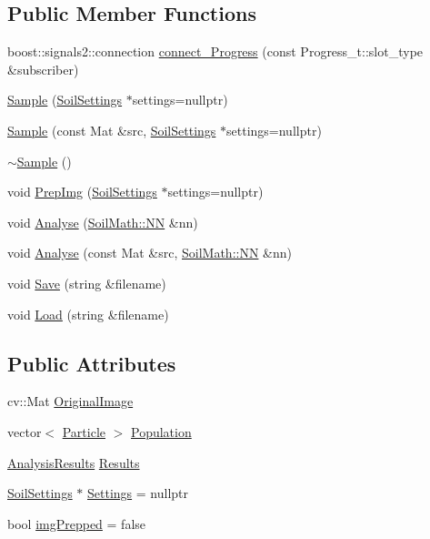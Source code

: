 \subsection*{Public Member Functions}
\begin{DoxyCompactItemize}
\item 
boost\+::signals2\+::connection \hyperlink{class_soil_analyzer_1_1_sample_a472dfdde346375463c979e45eb75fbb7}{connect\+\_\+\+Progress} (const Progress\+\_\+t\+::slot\+\_\+type \&subscriber)
\item 
\hyperlink{class_soil_analyzer_1_1_sample_aa132beeb85f46a9d14f7ed0903eda595}{Sample} (\hyperlink{class_soil_analyzer_1_1_soil_settings}{Soil\+Settings} $\ast$settings=nullptr)
\item 
\hyperlink{class_soil_analyzer_1_1_sample_a8d469b55b6af5c3e9283665df8430926}{Sample} (const Mat \&src, \hyperlink{class_soil_analyzer_1_1_soil_settings}{Soil\+Settings} $\ast$settings=nullptr)
\item 
\hyperlink{class_soil_analyzer_1_1_sample_a26f964ba39721002cbb182f3834ebb3c}{$\sim$\+Sample} ()
\item 
void \hyperlink{class_soil_analyzer_1_1_sample_a23050a1fff3e11e907657623756333b2}{Prep\+Img} (\hyperlink{class_soil_analyzer_1_1_soil_settings}{Soil\+Settings} $\ast$settings=nullptr)
\item 
void \hyperlink{class_soil_analyzer_1_1_sample_aeb62e34de081b3f298e9b8ebf82df36d}{Analyse} (\hyperlink{class_soil_math_1_1_n_n}{Soil\+Math\+::\+N\+N} \&nn)
\item 
void \hyperlink{class_soil_analyzer_1_1_sample_a5555ad91e224aeb59e2a301f23e1899f}{Analyse} (const Mat \&src, \hyperlink{class_soil_math_1_1_n_n}{Soil\+Math\+::\+N\+N} \&nn)
\item 
void \hyperlink{class_soil_analyzer_1_1_sample_a00fd0ec3bbea70454a6d8a6c1aaf34df}{Save} (string \&filename)
\item 
void \hyperlink{class_soil_analyzer_1_1_sample_a88f29d8ee3fad37cdad6cb88b2c8a288}{Load} (string \&filename)
\end{DoxyCompactItemize}
\subsection*{Public Attributes}
\begin{DoxyCompactItemize}
\item 
cv\+::\+Mat \hyperlink{class_soil_analyzer_1_1_sample_a0d6e6fca9e232a77329daf0b4b29c634}{Original\+Image}
\item 
vector$<$ \hyperlink{class_soil_analyzer_1_1_particle}{Particle} $>$ \hyperlink{class_soil_analyzer_1_1_sample_ab87a190f2b4a49bc71b355f9c52d8aa4}{Population}
\item 
\hyperlink{class_soil_analyzer_1_1_analysis_results}{Analysis\+Results} \hyperlink{class_soil_analyzer_1_1_sample_ab242ae1c2f229168fd630a9f31d7237f}{Results}
\item 
\hyperlink{class_soil_analyzer_1_1_soil_settings}{Soil\+Settings} $\ast$ \hyperlink{class_soil_analyzer_1_1_sample_a31f7b29fc46497f9b2847285c7893832}{Settings} = nullptr
\item 
bool \hyperlink{class_soil_analyzer_1_1_sample_ab025a26f7276128a5a974cae15b51dfc}{img\+Prepped} = false
\end{DoxyCompactItemize}
